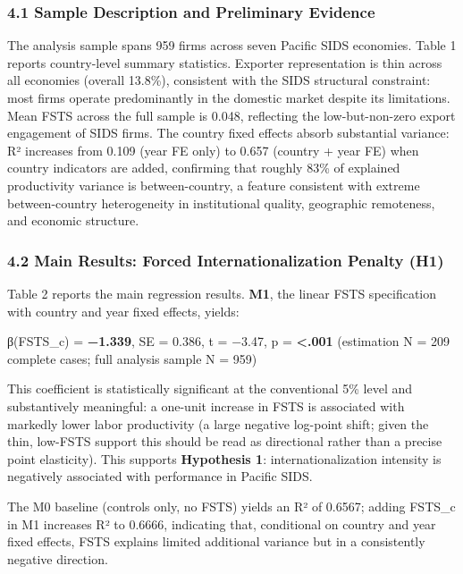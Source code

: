 \documentclass[
  12pt,a4paper]{article}
\begin{document}
\hypertarget{sample-description-and-preliminary-evidence}{%
\subsubsection{4.1 Sample Description and Preliminary
Evidence}\label{sample-description-and-preliminary-evidence}}

The analysis sample spans 959 firms across seven Pacific SIDS economies.
Table 1 reports country-level summary statistics. Exporter
representation is thin across all economies (overall 13.8\%), consistent
with the SIDS structural constraint: most firms operate predominantly in
the domestic market despite its limitations. Mean FSTS across the full
sample is 0.048, reflecting the low-but-non-zero export engagement of
SIDS firms. The country fixed effects absorb substantial variance: R²
increases from 0.109 (year FE only) to 0.657 (country + year FE) when
country indicators are added, confirming that roughly 83\% of explained
productivity variance is between-country, a feature consistent with
extreme between-country heterogeneity in institutional quality,
geographic remoteness, and economic structure.

\hypertarget{main-results-forced-internationalization-penalty-h1}{%
\subsubsection{4.2 Main Results: Forced Internationalization Penalty
(H1)}\label{main-results-forced-internationalization-penalty-h1}}

Table 2 reports the main regression results. \textbf{M1}, the linear
FSTS specification with country and year fixed effects, yields:

β(FSTS\_c) = \textbf{−1.339}, SE = 0.386, t = −3.47, p =
\textbf{\textless.001} (estimation N = 209 complete cases; full analysis
sample N = 959)

This coefficient is statistically significant at the conventional 5\%
level and substantively meaningful: a one-unit increase in FSTS is
associated with markedly lower labor productivity (a large negative
log-point shift; given the thin, low-FSTS support this should be read as
directional rather than a precise point elasticity). This supports
\textbf{Hypothesis 1}: internationalization intensity is negatively
associated with performance in Pacific SIDS.

The M0 baseline (controls only, no FSTS) yields an R² of 0.6567; adding
FSTS\_c in M1 increases R² to 0.6666, indicating that, conditional on
country and year fixed effects, FSTS explains limited additional
variance but in a consistently negative direction.
\end{document}

